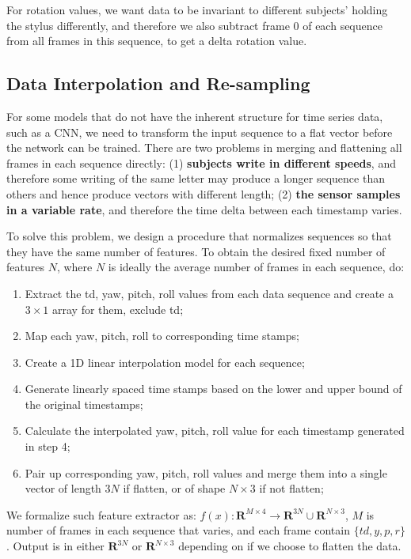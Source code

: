 \documentclass{article}
\begin{document}
\begin{multicols*}{2}
For rotation values, we want data to be invariant to different subjects' holding the stylus differently, and therefore we also subtract frame 0 of each sequence from all frames in this sequence, to get a delta rotation value.

\subsection{Data Interpolation and Re-sampling}

For some models that do not have the inherent structure for time series data, such as a CNN, we need to transform the input sequence to a flat vector before the network can be trained. There are two problems in merging and flattening all frames in each sequence directly:  (1) \textbf{subjects write in different speeds}, and therefore some writing of the same
letter may produce a longer sequence than others and hence produce vectors with different length; (2) \textbf{the sensor
samples in a variable rate}, and therefore the time delta between each timestamp varies.

To solve this problem, we design a procedure that normalizes sequences so that they have the same number of features. To obtain the desired fixed number of features $N$, where $N$ is ideally the average number of frames in each sequence, do:

\begin{enumerate}
    \item Extract the td, yaw, pitch, roll values from each data sequence and create a $3\times1$ array for them, exclude td;
    \item Map each yaw, pitch, roll to corresponding time stamps;
    \item Create a 1D linear interpolation model for each sequence;
    \item Generate linearly spaced time stamps based on the lower and upper bound of the original timestamps;
    \item Calculate the interpolated yaw, pitch, roll value for each timestamp generated in step 4;
    \item Pair up corresponding yaw, pitch, roll values and merge them into a single vector of length $3N$ if flatten, or of shape $N \times 3$ if not flatten;
\end{enumerate}

We formalize such feature extractor as: $f(x): \mathbf{R}^{M \times 4} \to \mathbf{R}^{3N} \cup \mathbf{R}^{N \times 3} $, $M$ is number of frames in each sequence that varies, and each frame contain $\{td,y,p,r\}$. Output is in either $\mathbf{R}^{3N}$ or $\mathbf{R}^{N \times 3}$ depending on if we choose to flatten the data.


\end{multicols*}
\end{document}
